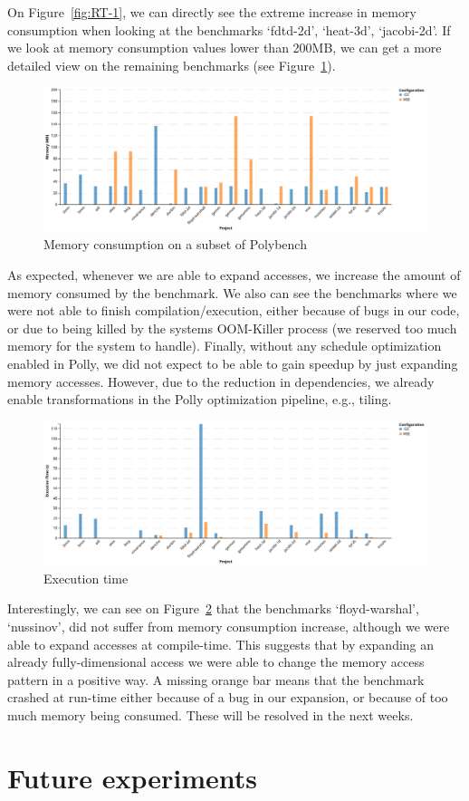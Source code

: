 On Figure~\ref{fig:RT-1}, we can directly see the extreme increase in memory consumption when looking at the benchmarks ‘fdtd-2d’, ‘heat-3d’, ‘jacobi-2d’. If we look at memory consumption values lower than 200MB, we can get a more detailed view on the remaining benchmarks (see Figure~\ref{fig:RT-2}).

\begin{figure}
\centering
\includegraphics[angle=90,origin=c,scale=0.5]{gfx/Evaluation/RT-2.png}
\caption{Memory consumption on a subset of Polybench}
\label{fig:RT-2}
\end{figure}

As expected, whenever we are able to expand accesses, we increase the amount of memory consumed by the benchmark. We also can see the benchmarks where we were not able to finish compilation/execution, either because of bugs in our code, or due to being killed by the systems OOM-Killer process (we reserved too much memory for the system to handle). Finally, without any schedule optimization enabled in Polly, we did not expect to be able to gain speedup by just expanding memory accesses. However, due to the reduction in dependencies, we already enable transformations in the Polly optimization pipeline, e.g., tiling.

\begin{figure}
\centering
\includegraphics[angle=90,origin=c,scale=0.5]{gfx/Evaluation/RT-3.png}
\caption{Execution time}
\label{fig:RT-3}
\end{figure}

Interestingly, we can see on Figure~\ref{fig:RT-3} that the benchmarks ‘floyd-warshal’, ‘nussinov’, did not suffer from memory consumption increase, although we were able to expand accesses at compile-time. This suggests that by expanding an already fully-dimensional access we were able to change the memory access pattern in a positive way. A missing orange bar means that the benchmark crashed at run-time either because of a bug in our expansion, or because of too much memory being consumed. These will be resolved in the next weeks.

\section{Future experiments}
